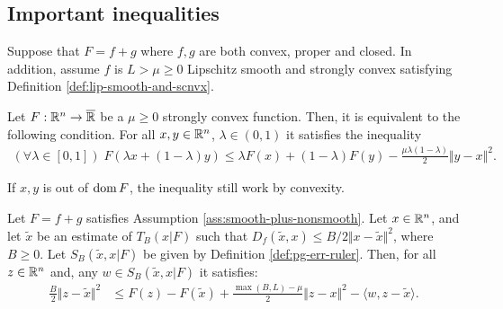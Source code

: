 \documentclass[12pt]{article}
\begin{document}
    \subsection{Important inequalities}
        \begin{assumption}\label{ass:smooth-plus-nonsmooth}
            Suppose that $F = f + g$ where $f, g$ are both convex, proper and closed. 
            In addition, assume $f$ is $L > \mu \ge 0$ Lipschitz smooth and strongly convex satisfying Definition \ref{def:lip-smooth-and-scnvx}. 
        \end{assumption}
        \begin{theorem}\label{thm:jesen}
            Let $F: \mathbb R^n \rightarrow \overline {\mathbb R}$ be a $\mu \ge 0$ strongly convex function. 
            Then, it is equivalent to the following condition. 
            For all $x, y \in \mathbb R^n$, $\lambda \in (0, 1)$ it satisfies the inequality 
            \begin{align*}
                (\forall \lambda \in [0, 1])\; 
                F(\lambda x + (1 - \lambda)y) \le \lambda F(x) + (1 - \lambda)F(y) -\frac{\mu\lambda(1 - \lambda)}{2} \Vert y - x\Vert^2. 
            \end{align*}
        \end{theorem}
        \begin{remark}
            If $x, y$ is out of $\operatorname{dom} F$, the inequality still work by convexity. 
        \end{remark}
        \begin{lemma}\label{lemma:inex-pg-ineq-proto}
            Let $F = f + g$ satisfies Assumption \ref{ass:smooth-plus-nonsmooth}. 
            Let $x \in \mathbb R^n$, and let $\tilde x$ be an estimate of $T_B(x | F)$ such that $D_f(\tilde x, x) \le B/2\Vert x - \tilde x\Vert^2$, where $B \ge 0$. 
            Let $S_B(\tilde x, x | F)$ be given by Definition \ref{def:pg-err-ruler}. 
            Then, for all $z \in \mathbb R^n$ and, any $w \in S_B(\tilde x, x | F)$ it satisfies: 
            \begin{align*}
                \frac{B}{2}\Vert z - \tilde x\Vert^2 &\le 
                F(z) - F(\tilde x) + \frac{\max(B, L) - \mu}{2}\Vert z - x\Vert^2 - \langle w, z - \tilde x \rangle. 
            \end{align*}
        \end{lemma}
\end{document}
